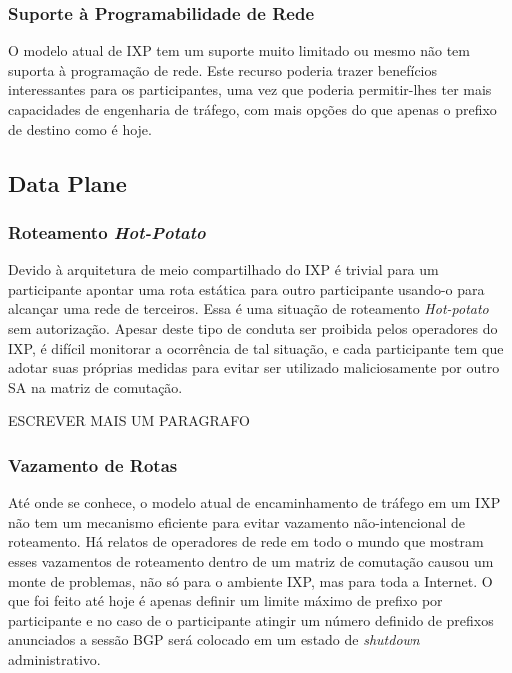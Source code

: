 \documentclass[12pt]{article}
\begin{document}
\subsubsection{Suporte à Programabilidade de Rede}
O modelo atual de IXP tem um suporte muito limitado ou mesmo não tem suporta à programação de rede. Este recurso poderia trazer benefícios interessantes para os participantes, uma vez que poderia permitir-lhes ter mais capacidades de engenharia de tráfego, com mais opções do que apenas o prefixo de destino como é hoje.


\subsection{Data Plane}
\subsubsection{Roteamento \textit{Hot-Potato}}
Devido à arquitetura de meio compartilhado do IXP é trivial para um participante apontar uma rota estática para outro participante usando-o para alcançar uma rede de terceiros. Essa é uma situação de roteamento \textit{Hot-potato} sem autorização. Apesar deste tipo de conduta ser proibida pelos operadores do IXP, é difícil monitorar a ocorrência de tal situação, e cada participante tem que adotar suas próprias medidas para evitar ser utilizado maliciosamente por outro SA na matriz de comutação.

ESCREVER MAIS UM PARAGRAFO

\subsubsection{Vazamento de Rotas}
\label{subsub:routingleak}
Até onde se conhece, o modelo atual de encaminhamento de tráfego em um IXP não tem um mecanismo eficiente para evitar vazamento não-intencional de roteamento. Há relatos de operadores de rede em todo o mundo que mostram esses vazamentos de roteamento dentro de um matriz de comutação causou um monte de problemas, não só para o ambiente IXP, mas para toda a Internet. O que foi feito até hoje é apenas definir um limite máximo de prefixo por participante e no caso de o participante atingir um número definido de prefixos anunciados a sessão BGP será colocado em um estado de \textit{shutdown} administrativo.
\end{document}
